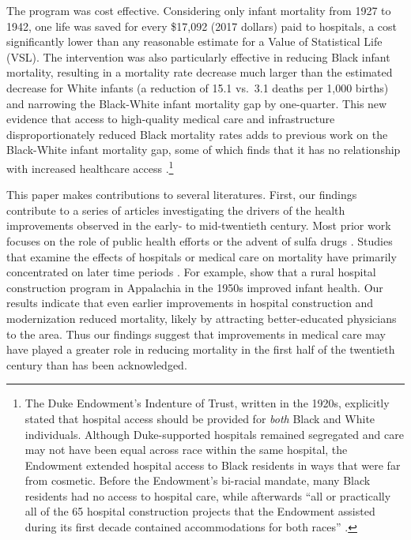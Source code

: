 \documentclass[12pt]{article}
\begin{document}

The program was cost effective.
Considering only infant mortality from 1927 to 1942, one life was saved for every \$17,092 (2017 dollars) paid to hospitals, a cost significantly lower than any reasonable estimate for a Value of Statistical Life (VSL). 
The intervention was also particularly effective in reducing Black infant mortality, resulting in a mortality rate decrease much larger than the estimated decrease for White infants (a reduction of 15.1 vs.\ 3.1 deaths per 1,000 births) and narrowing the Black-White infant mortality gap by one-quarter. 
This new evidence that access to high-quality medical care and infrastructure disproportionately reduced Black mortality rates adds to previous work on the Black-White infant mortality gap, some of which finds that it has no relationship with increased healthcare access  .\footnote{The Duke Endowment's Indenture of Trust, written in the 1920s, explicitly stated that hospital access should be provided for \emph{both} Black and White individuals. Although Duke-supported hospitals remained segregated and care may not have been equal across race within the same hospital, the Endowment extended hospital access to Black residents in ways that were far from cosmetic. Before the Endowment's bi-racial mandate, many Black residents had no access to  hospital care, while afterwards ``all or practically all of the 65 hospital construction projects that the Endowment assisted during its first decade contained accommodations for both races'' .} 


This paper makes contributions to several literatures.
First, our findings contribute to a series of articles investigating the drivers of the health improvements observed in the early- to mid-twentieth century.
Most prior work focuses on the role of public health efforts  or the advent of sulfa drugs .
Studies that examine the effects of hospitals or medical care on mortality have primarily concentrated on later time periods .
For example,  show that a rural hospital construction program in Appalachia in the 1950s improved infant health. 
Our results indicate that even earlier improvements in hospital construction and modernization reduced mortality, likely by attracting better-educated physicians to the area. 
Thus our findings suggest that improvements in medical care may have played a greater role in reducing mortality in the first half of the twentieth century than has been acknowledged.
\end{document}
